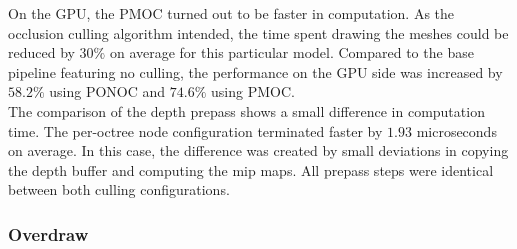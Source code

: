\noindent
On the \ac{GPU}, the \ac{PMOC} turned out to be faster in computation. As the occlusion culling algorithm 
intended, the time spent drawing the meshes could be reduced by $30\%$ on average for this particular model. 
Compared to the base pipeline featuring no culling, the performance on the \ac{GPU} side was increased by 
$58.2 \%$ using \ac{PONOC} and $74.6\%$ using \ac{PMOC}. \\

\noindent
The comparison of the depth prepass shows a small difference in computation time. The per-octree node configuration 
terminated faster by $1.93$ microseconds on average. In this case, the difference was created by small deviations in 
copying the depth buffer and computing the mip maps. All prepass steps were identical between both culling 
configurations.

\subsubsection*{Overdraw}

